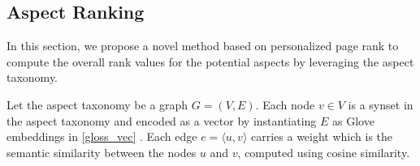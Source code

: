 \subsection{Aspect Ranking}
\label{sec:rank}
In this section, we propose a novel
method based on personalized page rank 
to compute the overall rank values
for the potential aspects by leveraging the aspect taxonomy.


Let the aspect taxonomy be a graph $G=(V, E)$.
Each node $v\in V$ is a synset in the aspect taxonomy and encoded 
as a vector by instantiating $E$ as Glove embeddings in \eqref{gloss_vec} .
Each edge $e = \langle u, v \rangle$ carries a weight which is
the semantic similarity between the nodes $u$ and $v$,
computed using cosine similarity.
%	
%

